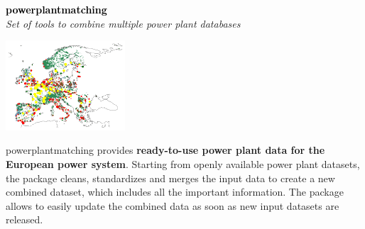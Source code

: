 \documentclass[a0,portrait]{a0poster}
\begin{document}
\begin{multicols}{3}
\noindent \textcolor{black}{\Large \textbf{powerplantmatching}}
\\
\textit{Set of tools to combine multiple power plant databases}
\vspace{0.5em}
\begin{center}
  \includegraphics[width=12em]{powerplantmatching.png}
\end{center}
\vspace{0.5em}
powerplantmatching provides \textbf{ready-to-use power plant data for the European power system}. 
Starting from openly available power plant datasets, the package cleans, standardizes 
and merges the input data to create a new combined dataset, which includes all the 
important information. The package allows to easily update the combined data as soon 
as new input datasets are released.


\singlespacing
\small
\nocite{*} %



\end{multicols}
\end{document}
